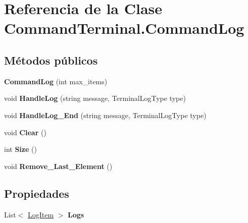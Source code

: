 \hypertarget{class_command_terminal_1_1_command_log}{}\section{Referencia de la Clase Command\+Terminal.\+Command\+Log}
\label{class_command_terminal_1_1_command_log}
\subsection*{Métodos públicos}
\begin{DoxyCompactItemize}
\item 
\mbox{\label{class_command_terminal_1_1_command_log_a1e8323467312989d520bb41e5b544336}} 
{\bfseries Command\+Log} (int max\+\_\+items)
\item 
\mbox{\label{class_command_terminal_1_1_command_log_ae51ecfc86979778ea965b5aa737db744}} 
void {\bfseries Handle\+Log} (string message, Terminal\+Log\+Type type)
\item 
\mbox{\label{class_command_terminal_1_1_command_log_a495c15dfa1c015a7b5d029b7416fd906}} 
void {\bfseries Handle\+Log\+\_\+\+End} (string message, Terminal\+Log\+Type type)
\item 
\mbox{\label{class_command_terminal_1_1_command_log_a057f3008fd63b0ba047e31649584715f}} 
void {\bfseries Clear} ()
\item 
\mbox{\label{class_command_terminal_1_1_command_log_a89057cc469791017cfbf27bbd8a74e86}} 
int {\bfseries Size} ()
\item 
\mbox{\label{class_command_terminal_1_1_command_log_a61a97fba295d961a87955a648881946d}} 
void {\bfseries Remove\+\_\+\+Last\+\_\+\+Element} ()
\end{DoxyCompactItemize}
\subsection*{Propiedades}
\begin{DoxyCompactItemize}
\item 
\mbox{\label{class_command_terminal_1_1_command_log_a856e252795994b69fbe9448a3ea9efc8}} 
List$<$ \mbox{\hyperlink{struct_command_terminal_1_1_log_item}{Log\+Item}} $>$ {\bfseries Logs}
\end{DoxyCompactItemize}
